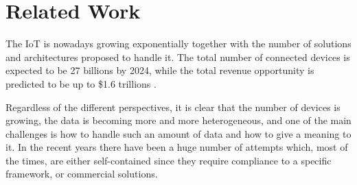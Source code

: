 \section{Related Work}

The IoT is nowadays growing exponentially together with the number of solutions and architectures proposed to handle it.
The total number of connected devices is expected to be 27 billions by 2024, while the total revenue opportunity is predicted to be up to \$1.6 trillions \cite{machina} .

Regardless of the different perspectives, it is clear that the number of devices is growing, the data is becoming more and more heterogeneous, and one of the main challenges is how to handle such an amount of data and how to give a meaning to it.
In the recent years there have been a huge number of attempts which, most of the times, are either self-contained since they require compliance to a specific framework, or commercial solutions.
\\


